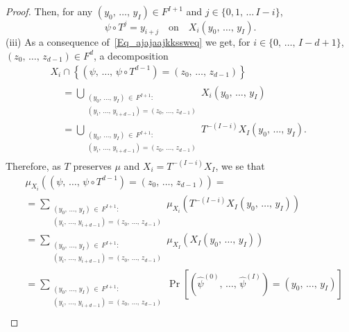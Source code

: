 \documentclass[AHL,Unicode,longabstracts]{cedram}
\begin{document}
\begin{proof}
Then, for any $(y_{0},\,\ldots,\,y_{I})\in F^{I+1}$ and $j\in\{0,1,\,\ldots\,I-i\}$,
\begin{equation}\label{Eq_ajajaajkkssweq}
\psi\circ T^{j}=y_{i+j}\quad \text{on}\quad X_{i}\left(y_{0},\,\ldots,\,y_{I}\right).
\end{equation}
(iii) As a consequence of~\eqref{Eq_ajajaajkkssweq} we get, for $i\in\{0,\,\ldots,\,I-d+1\}$, $(z_{0},\,\ldots,\,z_{d-1})\in F^{d}$, a decomposition
\begin{multline*}
X_{i}\cap\left\{\left(\psi,\,\ldots,\,\psi\circ T^{d-1}\right)=\left(z_{0},\,\ldots,\,z_{d-1}\right)\right\}\\
\begin{aligned}
&= {\displaystyle\bigcup\nolimits_{\substack{\left(y_{0},\,\ldots,\,y_{I}\right)\,\in\,F^{I+1}:\\
\left(y_{i},\,\ldots,\,y_{i+d-1}\right)=\left(z_{0},\,\ldots,\,z_{d-1}\right)}}} X_{i}\left(y_{0},\,\ldots,\,y_{I}\right)\\
&= {\displaystyle\bigcup\nolimits_{\substack{\left(y_{0},\,\ldots,\,y_{I}\right)\,\in\,F^{I+1}:\\
\left(y_{i},\,\ldots,\,y_{i+d-1}\right)=\left(z_{0},\,\ldots,\,z_{d-1}\right)}}} T^{-(I-i)}X_{I}\left(y_{0},\,\ldots,\,y_{I}\right).
\end{aligned}
\end{multline*}
Therefore, as $T$ preserves $\mu$ and $X_{i}=T^{-(I-i)}X_{I}$, we se that
\begin{align*}
& \mu_{X_{i}}\left(\left(\psi,\,\ldots,\,\psi\circ T^{d-1}\right)=\left(z_{0},\,\ldots,\,z_{d-1}\right)\right)=\\
& = {\displaystyle\sum\nolimits_{\substack{\left(y_{0},\,\ldots,\,y_{I}\right)\,\in\,F^{I+1} :\\
\left(y_{i},\,\ldots,\,y_{i+d-1}\right)=\left(z_{0},\,\ldots,\,z_{d-1}\right)}}}
\mu_{X_{i}}\left(T^{-(I-i)}X_{I}\left(y_{0},\,\ldots,\,y_{I}\right)\right)\\
& = {\displaystyle\sum\nolimits_{\substack{\left(y_{0},\,\ldots,\,y_{I}\right)\,\in\,F^{I+1} :\\
\left(y_{i},\,\ldots,\,y_{i+d-1}\right)=\left(z_{0},\,\ldots,\,z_{d-1}\right)}}}
\mu_{X_{I}}\left(X_{I}\left(y_{0},\,\ldots,\,y_{I}\right)\right)\\
& = {\displaystyle\sum\nolimits_{\substack{\left(y_{0},\,\ldots,\,y_{I}\right)\,\in\,F^{I+1} :\\
\left(y_{i},\,\ldots,\,y_{i+d-1}\right)=\left(z_{0},\,\ldots,\,z_{d-1}\right)}}}
\Pr\left[\left(\widehat{\psi}^{(0)},\,\ldots,\,\widehat{\psi}^{(I)}\right)=\left(y_{0},\,\ldots,\,y_{I}\right)\right]\\

\end{align*}
\end{proof}
\end{document}
